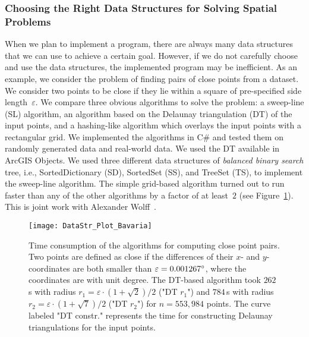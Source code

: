 \subsubsection{Choosing the Right Data Structures 
	for Solving Spatial Problems}

When we plan to implement a program, 
there are always many data structures that
we can use to achieve a certain goal.
However, if we do not carefully choose and use 
the data structures,
the implemented program may be inefficient.
As an example, we consider the problem of 
finding pairs of close points from a dataset. 
We consider two points to be close 
if they lie within a square of pre-specified 
side length~$\varepsilon$. 
We compare three obvious algorithms to solve the problem: 
a sweep-line (SL) algorithm, 
an algorithm based on the Delaunay triangulation (DT) 
of the input points, 
and a hashing-like algorithm 
which overlays the input points with a rectangular grid. 
We implemented the algorithms in C\# and tested them on 
randomly generated data and real-world data. 
We used the DT available in ArcGIS Objects. 
We used three different data structures
of \emph{balanced binary search} tree, 
i.e., SortedDictionary (SD), SortedSet (SS), and TreeSet (TS), 
to implement the sweep-line algorithm. 
The simple grid-based algorithm turned out to run faster than 
any of the other algorithms by a factor of at least~$2$ 
(see Figure~\ref{fig:Intro_DataStructure}).
This is joint work with 
Alexander Wolff~\parencite[see][]{Peng2014DataStr}.


\begin{figure}[tb]
\centering
\texttt{[image: DataStr\_Plot\_Bavaria]}
\caption{Time consumption of the algorithms
	for computing close point pairs. 
	Two points are defined as close if the differences 
	of their $x$- and $y$- coordinates are both smaller than
	$\varepsilon=0.001267 \degree$,
	where the coordinates are with unit degree. 
	The DT-based algorithm took $262\,$s 
	with radius $r_1=\varepsilon \cdot (1+\sqrt{2})/2$ 
	("DT $r_1$") and $784\,$s 
	with radius $r_2=\varepsilon \cdot (1+\sqrt{7})/2$ 
	("DT $r_2$") for $n=553{,}984$ points.
	The curve labeled "DT constr." represents 
	the time for constructing 
	Delaunay triangulations for the input points.
}
\label{fig:Intro_DataStructure}
\end{figure}


